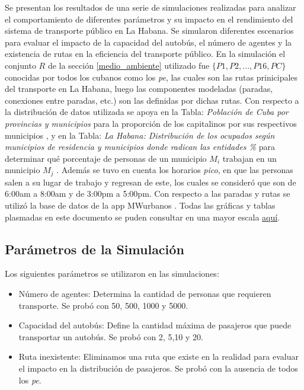\documentclass[a4paper,12pt]{article}
\begin{document}
Se presentan los resultados de una serie de simulaciones realizadas para analizar el comportamiento de diferentes parámetros y su impacto en el rendimiento del sistema de transporte público en La Habana. Se simularon diferentes escenarios para evaluar el impacto de la capacidad del autobús, el número de agentes y la existencia de rutas en la eficiencia del transporte público. En la simulaci\'on el conjunto $R$ de la secci\'on \ref{medio_ambiente}  utilizado fue $\{P1,P2,...,P16,PC\}$ conocidas por todos los cubanos como los \textit{pe}, las cuales son las rutas prinicipales del transporte en La Habana, luego las componentes modeladas (paradas, conexiones entre paradas, etc.) son las definidas por dichas rutas. Con respecto a la distribuci\'on de datos utilizada se apoya en la Tabla: \textit{Poblaci\'on de Cuba por provincias y municipios} para la proporci\'on de los capitalinos por sus respectivos municipios \cite{onei2022}, y en la Tabla: \textit{La Habana: Distribuci\'on de los ocupados seg\'un municipios de residencia y municipios donde radican las entidades \%} para determinar qu\'e porcentaje de personas de un municipio $M_i$ trabajan en un municipio $M_j$ \cite{aja2023}.  Adem\'as se tuvo en cuenta los horarios \textit{pico}, en que las personas salen a su lugar de trabajo y regresan de este, los cuales se consider\'o que son de 6:00am a 8:00am y de 3:00pm a 5:00pm. Con respecto a las paradas y rutas se utiliz\'o la base de datos de  la app MWurbanos \cite{apklis}. Todas las gr\'aficas y tablas plasmadas en este documento se puden consultar en una mayor escala \href{https://github.com/YoanRene/AI-Sim/tree/master/docs/imgs}{aqu\'i}. 

\subsection{Parámetros de la Simulación}

Los siguientes parámetros se utilizaron en las simulaciones:

\begin{itemize}
\item Número de agentes: Determina la cantidad de personas que requieren transporte. Se prob\'o con 50, 500, 1000 y 5000.
\item Capacidad del autobús: Define la cantidad máxima de pasajeros que puede transportar un autobús. Se prob\'o con 2, 5,10 y 20.
\item Ruta inexistente: Eliminamos una ruta que existe en la realidad para evaluar el impacto en la distribución de pasajeros. Se prob\'o con la ausencia de todos los \textit{pe}.
\end{itemize}
\end{document}
